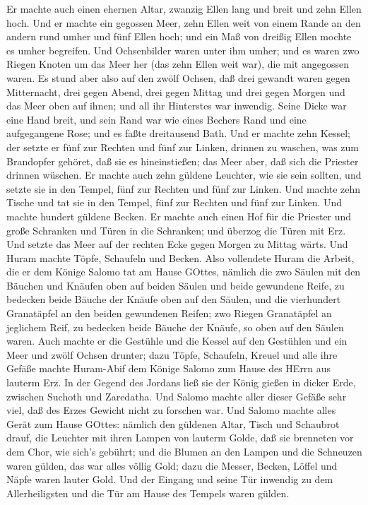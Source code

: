  Er machte auch einen ehernen Altar, zwanzig Ellen lang und
breit und zehn Ellen hoch.  Und er machte ein gegossen Meer,
zehn Ellen weit von einem Rande an den andern rund umher und fünf Ellen
hoch; und ein Maß von dreißig Ellen mochte es umher begreifen.
 Und Ochsenbilder waren unter ihm umher; und es waren zwo
Riegen Knoten um das Meer her (das zehn Ellen weit war), die mit
angegossen waren.  Es stund aber also auf den zwölf Ochsen,
daß drei gewandt waren gegen Mitternacht, drei gegen Abend, drei gegen
Mittag und drei gegen Morgen und das Meer oben auf ihnen; und all ihr
Hinterstes war inwendig.  Seine Dicke war eine Hand breit,
und sein Rand war wie eines Bechers Rand und eine aufgegangene Rose; und
es faßte dreitausend Bath.  Und er machte zehn Kessel; der
setzte er fünf zur Rechten und fünf zur Linken, drinnen zu waschen, was
zum Brandopfer gehöret, daß sie es hineinstießen; das Meer aber, daß
sich die Priester drinnen wüschen.  Er machte auch zehn
güldene Leuchter, wie sie sein sollten, und setzte sie in den Tempel,
fünf zur Rechten und fünf zur Linken.  Und machte zehn
Tische und tat sie in den Tempel, fünf zur Rechten und fünf zur Linken.
Und machte hundert güldene Becken.  Er machte auch einen Hof
für die Priester und große Schranken und Türen in die Schranken; und
überzog die Türen mit Erz.  Und setzte das Meer auf der
rechten Ecke gegen Morgen zu Mittag wärts.  Und Huram
machte Töpfe, Schaufeln und Becken. Also vollendete Huram die Arbeit,
die er dem Könige Salomo tat am Hause GOttes,  nämlich die
zwo Säulen mit den Bäuchen und Knäufen oben auf beiden Säulen und beide
gewundene Reife, zu bedecken beide Bäuche der Knäufe oben auf den
Säulen,  und die vierhundert Granatäpfel an den beiden
gewundenen Reifen; zwo Riegen Granatäpfel an jeglichem Reif, zu bedecken
beide Bäuche der Knäufe, so oben auf den Säulen waren. 
Auch machte er die Gestühle und die Kessel auf den Gestühlen
 und ein Meer und zwölf Ochsen drunter;  dazu
Töpfe, Schaufeln, Kreuel und alle ihre Gefäße machte Huram-Abif dem
Könige Salomo zum Hause des HErrn aus lauterm Erz.  In der
Gegend des Jordans ließ sie der König gießen in dicker Erde, zwischen
Suchoth und Zaredatha.  Und Salomo machte aller dieser
Gefäße sehr viel, daß des Erzes Gewicht nicht zu forschen war.
 Und Salomo machte alles Gerät zum Hause GOttes: nämlich
den güldenen Altar, Tisch und Schaubrot drauf,  die
Leuchter mit ihren Lampen von lauterm Golde, daß sie brenneten vor dem
Chor, wie sich's gebührt;  und die Blumen an den Lampen und
die Schneuzen waren gülden, das war alles völlig Gold; 
dazu die Messer, Becken, Löffel und Näpfe waren lauter Gold. Und der
Eingang und seine Tür inwendig zu dem Allerheiligsten und die Tür am
Hause des Tempels waren gülden.

